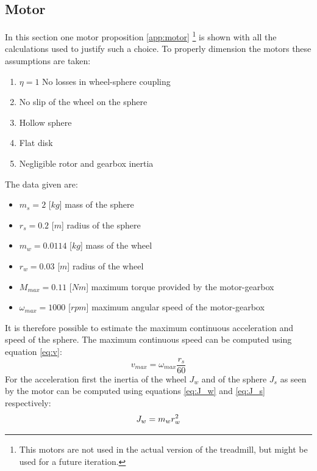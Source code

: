 \documentclass[12pt,a4paper, twoside]{article}
\begin{document}
\subsection{Motor}\label{sec:motor}
In this section one motor proposition \ref{app:motor} \footnote{This motors are not used in the actual version of the treadmill, but might be used for a future iteration.} is shown with all the calculations used to justify such a choice.
To properly dimension the motors these assumptions are taken:
\begin{multicols}{2}[]
\begin{enumerate}
	\item $\eta = 1$ No losses in wheel-sphere coupling
	\item No slip of the wheel on the sphere
	\item Hollow sphere
	\item Flat disk
	\item Negligible rotor and gearbox inertia 
\end{enumerate}
\end{multicols}
\noindent
The data given are:
\begin{multicols}{2}[]
\begin{itemize}
	\item $m_s = 2$ [$kg$] mass of the sphere
	\item $r_s = 0.2$ [$m$] radius of the sphere
	\item $m_w = 0.0114$ [$kg$] mass of the wheel
	\item $r_w = 0.03$ [$m$] radius of the wheel
	\item $M_{max} = 0.11$ [$Nm$] maximum torque provided by the motor-gearbox 
	\item $\omega_{max} = 1000$ [$rpm$] maximum angular speed of the motor-gearbox
\end{itemize}
\end{multicols}
\noindent
It is therefore possible to estimate the maximum continuous acceleration and speed of the sphere.
The maximum continuous speed can be computed using equation \ref{eq:v}:
\begin{equation}\label{eq:v}
	v_{max} = \omega_{max}\frac{r_s}{60}
\end{equation} 
For the acceleration first the inertia of the wheel $J_w$ and of the sphere $J_s$ as seen by the motor can be computed using equations \ref{eq:J_w} and \ref{eq:J_s} respectively:
\begin{equation}\label{eq:J_w}
J_w = m_wr_w^2\\
\end{equation}
\end{document}
